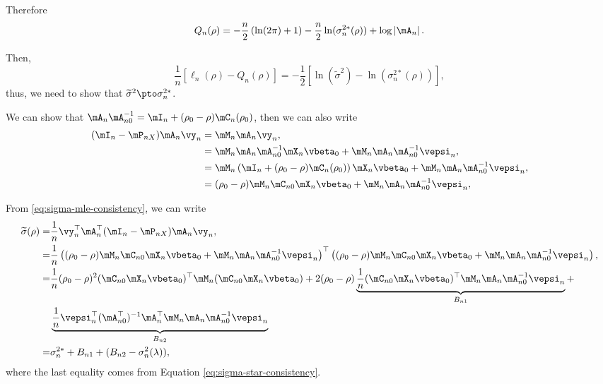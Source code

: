 \documentclass[english,12pt]{book}\usepackage[]{graphicx}\usepackage[]{xcolor}
\begin{document}
\begin{subappendices}
Therefore
\begin{equation*}
  Q_n(\rho) = -\frac{n}{2}\left(\ln(2\pi) + 1\right) - \frac{n}{2}\ln(\sigma^{2*}_n(\rho)) + \log\left|\mA_n\right|.
\end{equation*}

Then, 
\begin{equation}
\frac{1}{n}\left[\ell_n(\rho) - Q_n(\rho)\right] = -\frac{1}{2}\left[\ln( \widetilde{\sigma}^{2}) - \ln(\sigma^{2*}_n(\rho)) \right],
\end{equation}
%
thus, we need to show that $\widetilde{\sigma}^{2}\pto \sigma^{2*}_n$. 

We can show that $\mA_n\mA_{n0}^{-1} = \mI_n + (\rho_0 - \rho)\mC_n(\rho_0)$, then we can also write
\begin{equation*}
\begin{aligned}
  (\mI_n - \mP_{nX})\mA_n\vy_n & = \mM_n\mA_n\vy_n, \\
                               & = \mM_n\mA_n\mA_{n0}^{-1}\mX_n\vbeta_0 + \mM_n\mA_n\mA_{n0}^{-1}\vepsi_n, \\
& = \mM_n\left(\mI_n + (\rho_0 - \rho)\mC_n(\rho_0)\right)\mX_n\vbeta_0 + \mM_n\mA_n\mA_{n0}^{-1}\vepsi_n,       \\
& = (\rho_0 - \rho)\mM_n\mC_{n0}\mX_n\vbeta_0 + \mM_n\mA_n\mA_{n0}^{-1}\vepsi_n, 
\end{aligned}
\end{equation*}

From \eqref{eq:sigma-mle-consistency}, we can write
\begin{equation*}
\begin{aligned}
\widetilde{\sigma}(\rho)  = & \frac{1}{n}\vy_n^\top\mA_n^\top(\mI_n - \mP_{nX})\mA_n\vy_n, \\
 = & \frac{1}{n}\left((\rho_0 - \rho)\mM_n\mC_{n0}\mX_n\vbeta_0 + \mM_n\mA_n\mA_{n0}^{-1}\vepsi_n \right)^\top \left((\rho_0 - \rho)\mM_n\mC_{n0}\mX_n\vbeta_0 + \mM_n\mA_n\mA_{n0}^{-1}\vepsi_n \right), \\
 = & \frac{1}{n}(\rho_0 - \rho)^2(\mC_{n0}\mX_n\vbeta_0)^\top\mM_n(\mC_{n0}\mX_n\vbeta_0) + 2(\rho_0 - \rho)\underbrace{\frac{1}{n}(\mC_{n0}\mX_n\vbeta_0)^\top\mM_n\mA_n\mA_{n0}^{-1}\vepsi_n}_{B_{n1}} +  \\
& \underbrace{\frac{1}{n}\vepsi_n^\top(\mA_{n0}^\top)^{-1}\mA_n^\top\mM_n\mA_n\mA_{n0}^{-1}\vepsi_n}_{B_{n2}} \\
= & \sigma^{2*}_n + B_{n1} + (B_{n2} - \sigma^2_n(\lambda)), 
\end{aligned}
\end{equation*}
%
where the last equality comes from Equation \eqref{eq:sigma-star-consistency}. 


\end{subappendices}
\end{document}
